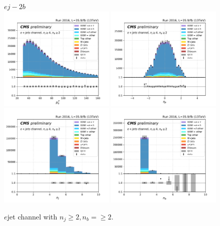\begin{figure}[ht]
    \centering
    $e j - 2b$ \\
    \includegraphics[width=0.49\textwidth]{chapters/Appendix/sectionPlots/figures/kinematics_pickles/e4j/2b/e4j_2b_lepton1_pt.pdf}
    \includegraphics[width=0.49\textwidth]{chapters/Appendix/sectionPlots/figures/kinematics_pickles/e4j/2b/e4j_2b_lepton1_eta.pdf}
    \includegraphics[width=0.49\textwidth]{chapters/Appendix/sectionPlots/figures/kinematics_pickles/e4j/2b/e4j_2b_nJets.pdf}
    \includegraphics[width=0.49\textwidth]{chapters/Appendix/sectionPlots/figures/kinematics_pickles/e4j/2b/e4j_2b_nBJets.pdf}
    
    \caption{$e$jet channel with $n_j\geq2, n_b=\geq2$.}
\end{figure}
